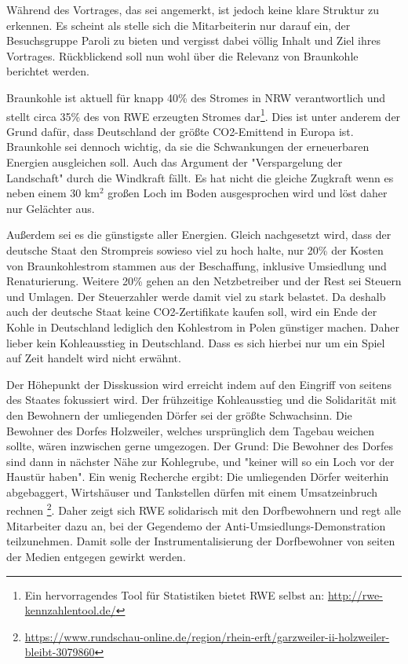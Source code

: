 \documentclass{article}
\begin{document}
Während des Vortrages, das sei angemerkt, ist jedoch keine klare Struktur zu erkennen.
Es scheint als stelle sich die Mitarbeiterin nur darauf ein, der Besuchsgruppe Paroli zu bieten und vergisst dabei
völlig Inhalt und Ziel ihres Vortrages.
Rückblickend soll nun wohl über die Relevanz von Braunkohle berichtet werden.

Braunkohle ist aktuell für knapp 40\% des Stromes in NRW verantwortlich und stellt circa 35\% des von RWE erzeugten Stromes dar\footnote{Ein hervorragendes Tool für Statistiken bietet RWE selbst an: \url{http://rwe-kennzahlentool.de/}}.
Dies ist unter anderem der Grund dafür, dass Deutschland der größte CO2-Emittend in Europa ist.
Braunkohle sei dennoch wichtig, da sie die Schwankungen der erneuerbaren Energien ausgleichen soll.
Auch das Argument der "Verspargelung der Landschaft" durch die Windkraft fällt.
Es hat nicht die gleiche Zugkraft wenn es neben einem 30 km$^2$ großen Loch im Boden ausgesprochen wird und löst daher nur Gelächter aus.

Außerdem sei es die günstigste aller Energien.
Gleich nachgesetzt wird, dass der deutsche Staat den Strompreis sowieso viel zu hoch halte,
nur 20\% der Kosten von Braunkohlestrom stammen aus der Beschaffung, inklusive Umsiedlung und Renaturierung.
Weitere 20\% gehen an den Netzbetreiber und der Rest sei Steuern und Umlagen.
Der Steuerzahler werde damit viel zu stark belastet.
Da deshalb auch der deutsche Staat keine CO2-Zertifikate kaufen soll,
wird ein Ende der Kohle in Deutschland lediglich den Kohlestrom in Polen günstiger machen.
Daher lieber kein Kohleausstieg in Deutschland.
Dass es sich hierbei nur um ein Spiel auf Zeit handelt wird nicht erwähnt.

Der Höhepunkt der Disskussion wird erreicht indem auf den Eingriff von seitens des Staates fokussiert wird.
Der frühzeitige Kohleausstieg und die Solidarität mit den Bewohnern der umliegenden Dörfer sei der größte Schwachsinn.
Die Bewohner des Dorfes Holzweiler, welches ursprünglich dem Tagebau weichen sollte, wären inzwischen gerne umgezogen.
Der Grund: Die Bewohner des Dorfes sind dann in nächster Nähe zur Kohlegrube, und "keiner will so ein Loch vor der Haustür haben".
Ein wenig Recherche ergibt: Die umliegenden Dörfer weiterhin abgebaggert, Wirtshäuser und Tankstellen dürfen mit einem
Umsatzeinbruch rechnen \footnote{\url{https://www.rundschau-online.de/region/rhein-erft/garzweiler-ii-holzweiler-bleibt-3079860}}.
Daher zeigt sich RWE solidarisch mit den Dorfbewohnern und regt alle Mitarbeiter dazu an, bei der Gegendemo der Anti-Umsiedlungs-Demonstration
teilzunehmen. Damit solle der Instrumentalisierung der Dorfbewohner von seiten der Medien entgegen gewirkt werden.
\end{document}
